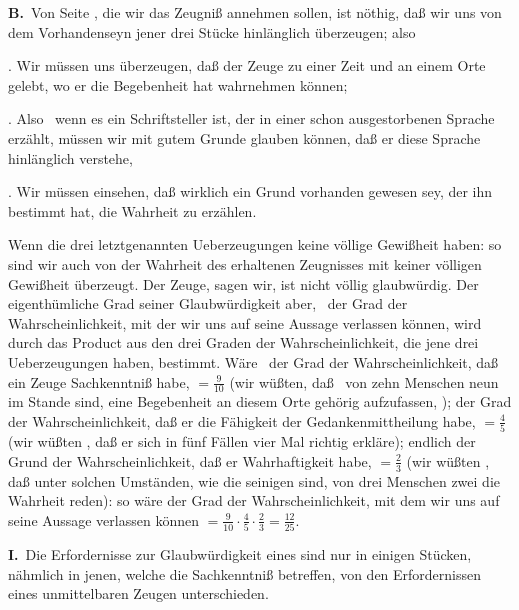 \vabst \textbf{B.}~Von Seite , die wir das Zeugniß annehmen sollen, ist nöthig, daß wir uns von dem Vorhandenseyn jener drei Stücke hinlänglich überzeugen; also
\begin{aufzb}
\item {}. Wir müssen uns überzeugen, daß der Zeuge zu einer Zeit und an einem Orte gelebt, wo er die Begebenheit hat wahrnehmen können; \usw
\item {}. Also \zB\ wenn es ein Schriftsteller ist, der in einer schon ausgestorbenen Sprache erzählt, müssen wir mit gutem Grunde glauben können, daß er diese Sprache hinlänglich verstehe, \udgl
\item {}. Wir müssen einsehen, daß wirklich ein Grund vorhanden gewesen sey, der ihn bestimmt hat, die Wahrheit zu erzählen.
\end{aufzb}
\begin{RWanm}
Wenn die drei letztgenannten Ueberzeugungen keine völlige Gewißheit haben: so sind wir auch von der Wahrheit des erhaltenen Zeugnisses mit keiner völligen Gewißheit überzeugt. Der Zeuge, sagen wir, ist nicht völlig glaubwürdig. Der eigenthümliche Grad seiner Glaubwürdigkeit aber, \dh\ der Grad der Wahrscheinlichkeit, mit der wir uns auf seine Aussage verlassen können, wird durch das Product aus den drei Graden der Wahrscheinlichkeit, die jene drei Ueberzeugungen haben, bestimmt. Wäre \zB\ der Grad der Wahrscheinlichkeit, daß ein Zeuge Sachkenntniß habe, $= \frac{9}{10}$ (wir wüßten, daß \zB\ von zehn Menschen neun im Stande sind, eine Begebenheit an diesem Orte gehörig aufzufassen, \usw ); der Grad der Wahrscheinlichkeit, daß er die Fähigkeit der Gedankenmittheilung habe, $= \frac{4}{5}$ (wir wüßten \zB , daß er sich in fünf Fällen vier Mal richtig erkläre); endlich der Grund der Wahrscheinlichkeit, daß er Wahrhaftigkeit habe, $ = \frac{2}{3}$ (wir wüßten \zB , daß unter solchen Umständen, wie die seinigen sind, von drei Menschen zwei die Wahrheit reden): so wäre der Grad der Wahrscheinlichkeit, mit dem wir uns auf seine Aussage verlassen können $= \frac{9}{10} \cdot \frac{4}{5} \cdot \frac{2}{3} = \frac{12}{25}$.~
\end{RWanm}

\textbf{I.}~Die Erfordernisse zur Glaubwürdigkeit eines  sind nur in einigen Stücken, nähmlich in jenen, welche die Sachkenntniß betreffen, von den Erfordernissen eines unmittelbaren Zeugen unterschieden.\par

